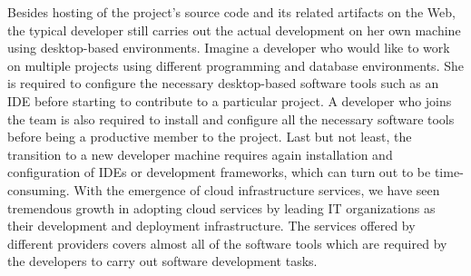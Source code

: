 \documentclass[11pt,fleqn,twoside]{article}
\begin{document}

Besides hosting of the project's source code and its related artifacts on the Web, the typical developer still carries out the actual development on her own machine using desktop-based environments. Imagine a developer who would like to work on multiple projects using different programming and database environments. She is required to configure the necessary desktop-based software tools such as an IDE before starting to contribute to a particular project. A developer who joins the team is also required to install and configure all the necessary software tools before being a productive member to the project. Last but not least, the transition to a new developer machine requires again installation and configuration of IDEs or development frameworks, which can turn out to be time-consuming. With the emergence of cloud infrastructure services, we have seen tremendous growth in adopting cloud services by leading IT organizations as their development and deployment infrastructure. The services offered by different providers covers almost all of the software tools which are required by the developers to carry out software development tasks. 
\end{document}
